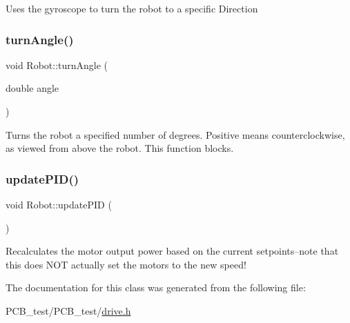 Uses the gyroscope to turn the robot to a specific Direction \mbox{\label{classRobot_a16a8fc6dbaa682231fc5f02754d3d686}} 
\subsubsection{\texorpdfstring{turn\+Angle()}{turnAngle()}}
{\footnotesize\ttfamily void Robot\+::turn\+Angle (\begin{DoxyParamCaption}\item[{double}]{angle }\end{DoxyParamCaption})\hspace{0.3cm}{\ttfamily [inline]}}

Turns the robot a specified number of degrees. Positive means counterclockwise, as viewed from above the robot. This function blocks. \mbox{\label{classRobot_a7f156346f70997f29e326d0d96acc4d0}} 
\subsubsection{\texorpdfstring{update\+P\+I\+D()}{updatePID()}}
{\footnotesize\ttfamily void Robot\+::update\+P\+ID (\begin{DoxyParamCaption}{ }\end{DoxyParamCaption})\hspace{0.3cm}{\ttfamily [inline]}}

Recalculates the motor output power based on the current setpoints--note that this does N\+OT actually set the motors to the new speed! 

The documentation for this class was generated from the following file\+:\begin{DoxyCompactItemize}
\item 
P\+C\+B\+\_\+test/\+P\+C\+B\+\_\+test/\hyperlink{drive_8h}{drive.\+h}\end{DoxyCompactItemize}
